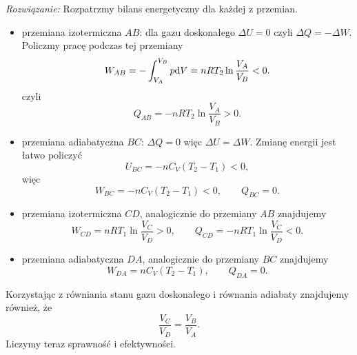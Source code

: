 \documentclass[11pt,a4paper]{article}
\begin{document}
{\em Rozwiązanie:}
Rozpatrzmy bilans energetyczny dla każdej z przemian.
\begin{itemize}
	\item przemiana izotermiczna $AB$: dla gazu doskonałego $\Delta U = 0$ czyli $\Delta Q = - \Delta W$. Policzmy pracę podczas tej przemiany
	\begin{equation}
		W_{AB} = - \int_{V_A}^{V_B} p {\rm d}V =  n R T_2  \ln \frac{V_A}{V_B} < 0.
	\end{equation}
	czyli
	\begin{equation}
		Q_{AB} = - n R T_2 \ln \frac{V_A}{V_B} > 0.
	\end{equation}
	\item przemiana adiabatyczna $BC$: $\Delta Q = 0$ więc $\Delta U = \Delta W$. Zmianę energii jest łatwo policzyć
	\begin{equation}
		U_{BC} = - n C_V (T_2 - T_1) < 0,
	\end{equation}
	więc 
	\begin{equation}
		W_{BC} = - n C_V (T_2 - T_1) < 0, \qquad Q_{BC} = 0.
	\end{equation}
	\item przemiana izotermiczna $CD$, analogicznie do przemiany $AB$ znajdujemy
	\begin{equation}
		W_{CD} =  n R T_1 \ln \frac{V_C}{V_D} > 0, \qquad Q_{CD} = - n RT_1 \ln \frac{V_C}{V_D} < 0.
	\end{equation}
	\item przemiana adiabatyczna $DA$, analogicznie do przemiany $BC$ znajdujemy
	\begin{equation}
		W_{DA} = n C_V (T_2 - T_1), \qquad Q_{DA} = 0.
	\end{equation}
\end{itemize}
Korzystając z równiania stanu gazu doskonałego i równania adiabaty znajdujemy również, że
\begin{equation}
	\frac{V_C}{V_D} = \frac{V_B}{V_A}.
\end{equation}
Liczymy teraz sprawność i efektywności.
\end{document}

